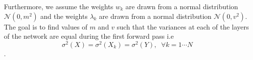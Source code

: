 \documentclass[AMS,STIX1COL]{WileyNJD-v2}
\begin{document}
 


Furthermore, we assume the weights $w_k$ are drawn from a normal distribution $\mathcal N(0, m^2)$ and the weights $\lambda_k$ are drawn from a normal distribution $\mathcal N(0, v^2)$. The goal is to find values of $m$ and $v$ such that the variances at each of the layers of the network are equal during the first forward pass i.e $$\sigma^2(X) = \sigma^2(X_k) = \sigma^2(Y),\; \; \forall k=1\cdots N$$.
\end{document}

